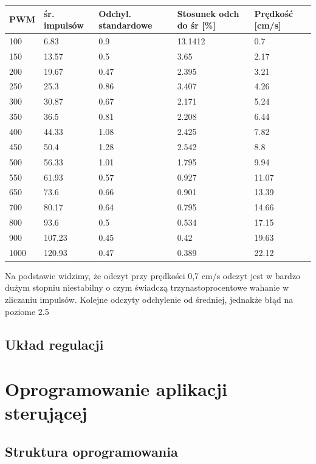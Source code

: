 \documentclass[eng,printmode]{mgr}
\begin{document}
\begin{tabular}{ | l | l | l | l | l | }
\hline
	PWM & śr. impulsów & Odchyl. standardowe & Stosunek odch do śr [\%] & Prędkość [cm/s]  \\ \hline
	100 & 6.83 & 0.9 & 13.1412 & 0.7 \\ \hline
	150 & 13.57 & 0.5 & 3.65 & 2.17 \\ \hline
	200 & 19.67 & 0.47 & 2.395 & 3.21 \\ \hline
	250 & 25.3 & 0.86 & 3.407 & 4.26 \\ \hline
	300 & 30.87 & 0.67 & 2.171 & 5.24 \\ \hline
	350 & 36.5 & 0.81 & 2.208 & 6.44 \\ \hline
	400 & 44.33 & 1.08 & 2.425 & 7.82 \\ \hline
	450 & 50.4 & 1.28 & 2.542 & 8.8 \\ \hline
	500 & 56.33 & 1.01 & 1.795 & 9.94 \\ \hline
	550 & 61.93 & 0.57 & 0.927 & 11.07 \\ \hline
	650 & 73.6 & 0.66 & 0.901 & 13.39 \\ \hline
	700 & 80.17 & 0.64 & 0.795 & 14.66 \\ \hline
	800 & 93.6 & 0.5 & 0.534 & 17.15 \\ \hline
	900 & 107.23 & 0.45 & 0.42 & 19.63 \\ \hline
	1000 & 120.93 & 0.47 & 0.389 & 22.12 \\ \hline
\end{tabular}
Na podstawie widzimy, że odczyt przy prędkości 0,7 cm/s odczyt jest w bardzo dużym stopniu niestabilny o czym świadczą trzynastoprocentowe wahanie w zliczaniu impulsów. Kolejne odczyty odchylenie od średniej, jednakże błąd na poziome 2.5%



 \section{Układ regulacji}

\chapter{Oprogramowanie aplikacji sterującej}

 \section{Struktura oprogramowania}
\end{document}
